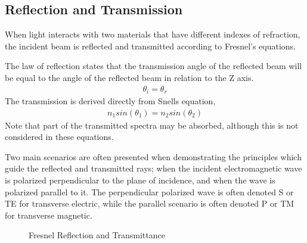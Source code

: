 \subsection{Reflection and Transmission}

When light interacts with two materials that have different indexes of refraction, the incident beam is reflected and transmitted according to Fresnel’s equations.

The law of reflection states that the transmission angle of the reflected beam will be equal to the angle of the reflected beam in relation to the Z axis.
%
\begin{align}
    \theta_i = \theta_r
\end{align}
%
The transmission is derived directly from Snells equation,
%
\begin{align}
    n_1sin(\theta_1) = n_2sin(\theta_2)
\end{align}
%
Note that part of the transmitted spectra may be absorbed, although this is not considered in these equations.

Two main scenarios are often presented when demonstrating the principles which guide the reflected and transmitted rays; when the incident electromagnetic wave is polarized perpendicular to the plane of incidence, and when the wave is polarized parallel to it.  The perpendicular polarized wave is often denoted S or TE for transverse electric, while the parallel scenario is often denoted P or TM for transverse magnetic.

\begin{figure}[!htb]
    \begin{center}
    \end{center}
    \caption{Fresnel Reflection and Transmittance}
    \label{fig:polarization}
\end{figure}

